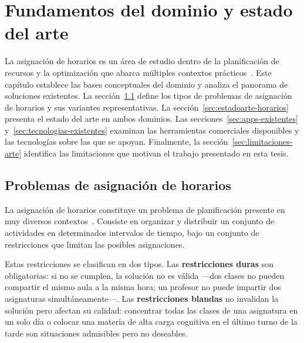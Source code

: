 \chapter{Fundamentos del dominio y estado del arte}
\label{cap:estadoarte}

La asignación de horarios es un área de estudio dentro de la planificación de
recursos y la optimización que abarca múltiples contextos prácticos~\cite{babaei2015}.
Este capítulo establece las bases conceptuales del dominio y analiza el panorama
de soluciones existentes.
La sección~\ref{sec:tipos-horarios} define los tipos de problemas de asignación
de horarios y sus variantes representativas.
La sección~\ref{sec:estadoarte-horarios} presenta el estado del arte en ambos
dominios.
Las secciones~\ref{sec:apps-existentes} y~\ref{sec:tecnologias-existentes}
examinan las herramientas comerciales disponibles y las tecnologías sobre las
que se apoyan.
Finalmente, la sección~\ref{sec:limitaciones-arte} identifica las limitaciones
que motivan el trabajo presentado en esta tesis.

\section{Problemas de asignaci\'on de horarios}
\label{sec:tipos-horarios}

La asignación de horarios constituye un problema de planificación presente en
muy diversos contextos~\cite{babaei2015}.  Consiste en organizar y distribuir
un conjunto de actividades en determinados intervalos de tiempo, bajo un
conjunto de restricciones que limitan las posibles asignaciones.

Estas restricciones se clasifican en dos tipos.  Las \textbf{restricciones
duras} son obligatorias: si no se cumplen, la solución no es válida ---dos
clases no pueden compartir el mismo aula a la misma hora; un profesor no puede
impartir dos asignaturas simultáneamente---.  Las \textbf{restricciones
blandas} no invalidan la solución pero afectan su calidad: concentrar todas
las clases de una asignatura en un solo día o colocar una materia de alta
carga cognitiva en el último turno de la tarde son situaciones admisibles
pero no deseables.

